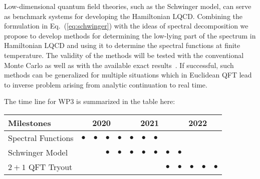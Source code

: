 \documentclass[10pt]{article}
\begin{document}
Low-dimensional quantum field theories, such as the Schwinger model,
can serve as benchmark systems for developing the Hamiltonian LQCD.
Combining the formulation in Eq.~(\ref{eq:schwinger}) with the ideas
of spectral decomposition 
we propose
to develop methods for determining the low-lying part of the spectrum
in Hamiltonian LQCD and using it to determine the spectral functions
at finite temperature. The validity of the methods will be tested with the
conventional Monte Carlo as well as with the available exact
results~\cite{Fayyazuddin:1993ua}.
If successful, such methods can be generalized for
multiple situations which in Euclidean QFT lead to inverse problem arising
from analytic continuation to real time.





The time line for WP3 is summarized in the table here:
\begin{footnotesize}
\begin{center}
\begin{tabular}{|l|c|c|c|c|c|c|c|c|c|c|c|c|}
\hline
\multicolumn{1}{|l}{Milestones } & \multicolumn{4}{|c|}{ 2020 } & \multicolumn{4}{c|}{ 2021 } & \multicolumn{4}{c|}{ 2022 } \\
\hline
Spectral  Functions   & $\bullet$&$\bullet$ & $\bullet$&$\bullet$ &$\bullet$ &$\bullet$ &$\bullet$ & & & &  &  \\
\hline
Schwinger  Model & & &$\bullet$ &$\bullet$ & $\bullet$ &$\bullet$ & $\bullet$ & $\bullet$ &$\bullet$ & &  &  \\
\hline
$2+1$ QFT Tryout & && & & & & & $\bullet$ & $\bullet$ &$\bullet$ & $\bullet$& $\bullet$ \\
\hline

\end{tabular}
\end{center}
\end{footnotesize}
\end{document}
